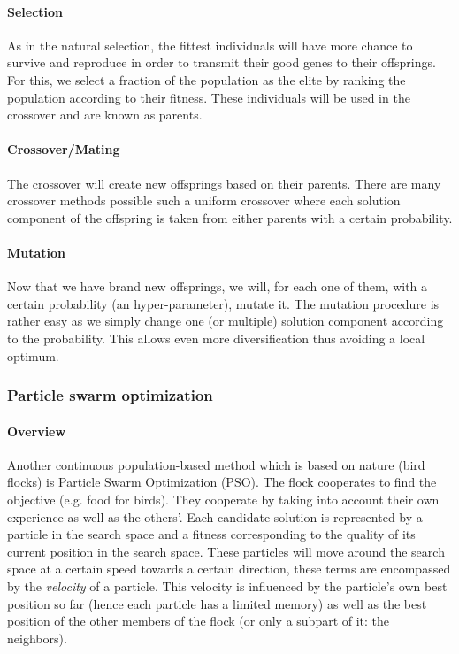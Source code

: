     \paragraph{Selection}
        As in the natural selection, the fittest individuals will have more chance to survive and reproduce in order to transmit their good genes to their offsprings. For this, we select a fraction of the population as the elite by ranking the population according to their fitness. These individuals will be used in the crossover and are known as parents.
    
    \paragraph{Crossover/Mating}
        The crossover will create new offsprings based on their parents. There are many crossover methods possible such a uniform crossover where each solution component of the offspring is taken from either parents with a certain probability. \cite{falkenauer1999worth}
    
    \paragraph{Mutation} 
        Now that we have brand new offsprings, we will, for each one of them, with a certain probability (an hyper-parameter), mutate it. The mutation procedure is rather easy as we simply change one (or multiple) solution component according to the probability.
        This allows even more diversification thus avoiding a local optimum.

    \subsubsection{Particle swarm optimization}

    \paragraph{Overview}
        Another continuous population-based method which is based on nature (bird flocks) is Particle Swarm Optimization (PSO). The flock cooperates to find the objective (e.g. food for birds). They cooperate by taking into account their own experience as well as the others'. \cite{pso} Each candidate solution is represented by a particle in the search space and a fitness corresponding to the quality of its current position in the search space. These particles will move around the search space at a certain speed towards a certain direction, these terms are encompassed by the \emph{velocity} of a particle. This velocity is influenced by the particle's own best position so far (hence each particle has a limited memory) as well as the best position of the other members of the flock (or only a subpart of it: the neighbors).


